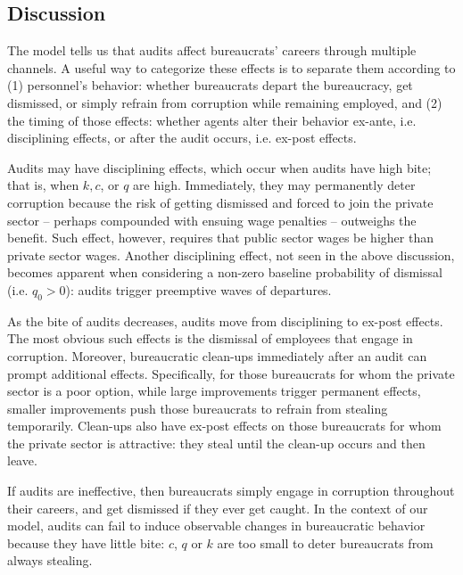 {\subsection{Discussion} 

The model tells us that audits affect bureaucrats' careers through multiple channels. A useful way to categorize these effects is to separate them according to (1) personnel's behavior: whether bureaucrats depart the bureaucracy, get dismissed, or simply refrain from corruption while remaining employed, and (2) the timing of those effects: whether agents alter their behavior ex-ante, i.e. disciplining effects, or after the audit occurs, i.e. ex-post effects. 

Audits may have disciplining effects, which occur when audits have high bite; that is, when $k, c$, or $q$ are high. Immediately, they may permanently deter corruption because the risk of getting dismissed and forced to join the private sector -- perhaps compounded with ensuing wage penalties -- outweighs the benefit. Such effect, however, requires that public sector wages be higher than private sector wages. Another disciplining effect, not seen in the above discussion, becomes apparent when considering a non-zero baseline probability of dismissal (i.e. $q_0 > 0$): audits trigger preemptive waves of departures.  

As the bite of audits decreases, audits move from disciplining to ex-post effects. The most obvious such effects is the dismissal of employees that engage in corruption. Moreover, bureaucratic clean-ups immediately after an audit can prompt additional effects. Specifically, for those bureaucrats for whom the private sector is a poor option, while large improvements trigger permanent effects, smaller improvements push those bureaucrats to refrain from stealing temporarily. Clean-ups also have ex-post effects on those bureaucrats for whom the private sector is attractive: they steal until the clean-up occurs and then leave.

If audits are ineffective, then bureaucrats simply engage in corruption throughout their careers, and get dismissed if they ever get caught. In the context of our model, audits can fail to induce observable changes in bureaucratic behavior because they have little bite: $c$, $q$ or $k$ are too small to deter bureaucrats from always stealing. 

}
